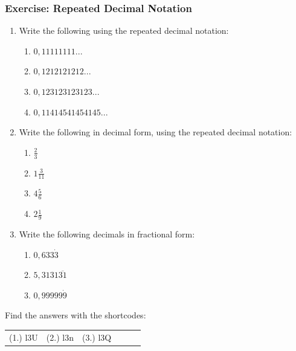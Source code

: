             \subsubsection{Exercise: Repeated Decimal Notation }
            \nopagebreak
      \label{m38348*id64513}\begin{enumerate}[noitemsep, label=\textbf{\arabic*}. ] 
            \label{m38348*uid23}\item Write the following using the repeated decimal notation:
\label{m38348*id64529}\begin{enumerate}[noitemsep, label=\textbf{\alph*}. ] 
            \label{m38348*uid24}\item $0,11111111...$\label{m38348*uid25}\item $0,1212121212...$\label{m38348*uid26}\item $0,123123123123...$\label{m38348*uid27}\item $0,11414541454145...$\end{enumerate}
        \label{m38348*uid28}\item Write the following in decimal form, using the repeated decimal notation:
\label{m38348*id64650}\begin{enumerate}[noitemsep, label=\textbf{\alph*}. ] 
            \label{m38348*uid29}\item $\frac{2}{3}$\label{m38348*uid30}\item $1\frac{3}{11}$\label{m38348*uid31}\item $4\frac{5}{6}$\label{m38348*uid32}\item $2\frac{1}{9}$\end{enumerate}
        \label{m38348*uid33}\item Write the following decimals in fractional form:
\label{m38348*id64767}\begin{enumerate}[noitemsep, label=\textbf{\alph*}. ] 
            \label{m38348*uid34}\item $0,633\dot{3}$\label{m38348*uid35}\item $5,3131\overline{31}$\label{m38348*uid36}\item $0,99999\dot{9}$\end{enumerate}
        \end{enumerate}
\par {} Find the answers with the shortcodes:
 \par \begin{tabular}[h]{cccccc}
 (1.) l3U  &  (2.) l3n  &  (3.) l3Q  & \end{tabular}
